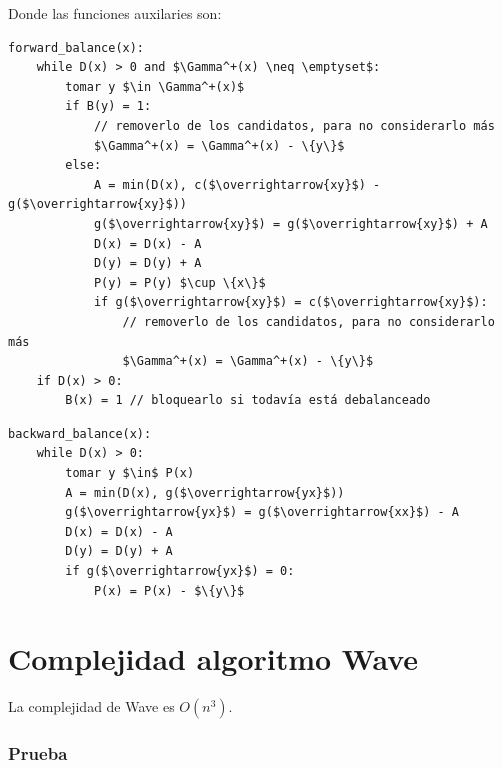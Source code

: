 \documentclass[10pt,a4paper]{article}
\begin{document}
 Donde las funciones auxilaries son: 


    \begin{lstlisting}[language=pseudo]
forward_balance(x):
    while D(x) > 0 and $\Gamma^+(x) \neq \emptyset$:
        tomar y $\in \Gamma^+(x)$
        if B(y) = 1:
            // removerlo de los candidatos, para no considerarlo más
            $\Gamma^+(x) = \Gamma^+(x) - \{y\}$
        else:
            A = min(D(x), c($\overrightarrow{xy}$) - g($\overrightarrow{xy}$))
            g($\overrightarrow{xy}$) = g($\overrightarrow{xy}$) + A
            D(x) = D(x) - A
            D(y) = D(y) + A
            P(y) = P(y) $\cup \{x\}$
            if g($\overrightarrow{xy}$) = c($\overrightarrow{xy}$):
                // removerlo de los candidatos, para no considerarlo más
                $\Gamma^+(x) = \Gamma^+(x) - \{y\}$
    if D(x) > 0:
        B(x) = 1 // bloquearlo si todavía está debalanceado
\end{lstlisting}



    \begin{lstlisting}[language=pseudo]
backward_balance(x):
    while D(x) > 0:
        tomar y $\in$ P(x)
        A = min(D(x), g($\overrightarrow{yx}$))
        g($\overrightarrow{yx}$) = g($\overrightarrow{xx}$) - A
        D(x) = D(x) - A
        D(y) = D(y) + A
        if g($\overrightarrow{yx}$) = 0:
            P(x) = P(x) - $\{y\}$
\end{lstlisting}

\section*{Complejidad algoritmo Wave}

La complejidad de Wave es $O(n^3)$.

\subsubsection*{Prueba}
\end{document}
